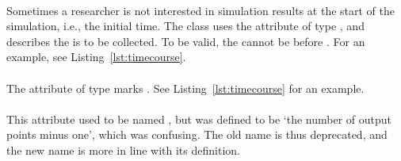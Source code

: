 \paragraph*{}
\label{sec:outputStartTime}
Sometimes a researcher is not interested in simulation results at the start of the simulation, i.e., the initial time. The \UniformTimeCourse class uses the attribute  of type , and describes the  is to be collected. To be valid, the  cannot be before \hyperref[sec:initialTime]{}. For an example, see Listing~\ref{lst:timecourse}. 

\paragraph*{}
\label{sec:outputEndTime}
The attribute  of type  marks . See Listing~\ref{lst:timecourse} for an example. 

\paragraph*{}
\label{sec:numberOfSteps}

This attribute used to be named , but was defined to be `the number of output points minus one', which was confusing.  The old name is thus deprecated, and the new name is more in line with its definition.


